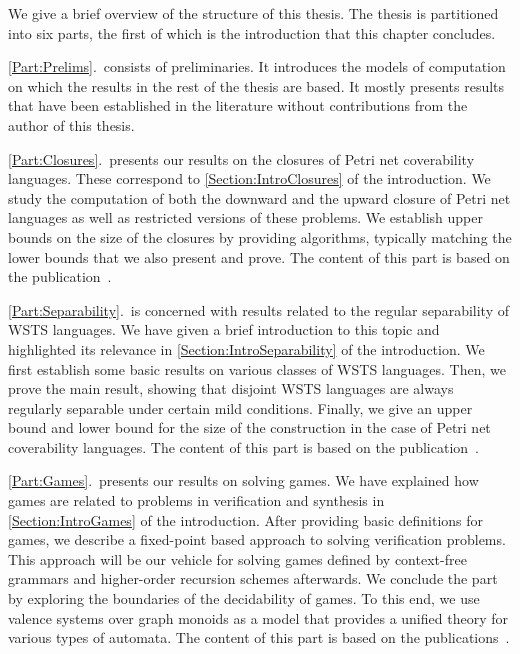 \documentclass[../../diss.tex]{subfiles}
\begin{document}

We give a brief overview of the structure of this thesis.
The thesis is partitioned into six parts, the first of which is the introduction that this chapter concludes.

\cref{Part:Prelims}.~consists of preliminaries.
It introduces the models of computation on which the results in the rest of the thesis are based.
It mostly presents results that have been established in the literature without contributions from the author of this thesis.

\cref{Part:Closures}.~presents our results on the closures of Petri net coverability languages.
These correspond to \cref{Section:IntroClosures} of the introduction.
We study  the computation of both the downward and the upward closure of Petri net languages as well as restricted versions of these problems.
We establish upper bounds on the size of the closures by providing algorithms, typically matching the lower bounds that we also present and prove.
The content of this part is based on the publication~\cite{AtigMMS17}.

\cref{Part:Separability}.~is concerned with results related to the regular separability of WSTS languages.
We have given a brief introduction to this topic and highlighted its relevance in \cref{Section:IntroSeparability} of the introduction.
We first establish some basic results on various classes of WSTS languages.
Then, we prove the main result, showing that disjoint WSTS languages are always regularly separable under certain mild conditions.
Finally, we give an upper bound and lower bound for the size of the construction in the case of Petri net coverability languages.
The content of this part is based on the publication~\cite{CzerwinskiLMMKS18}.

\cref{Part:Games}.~presents our results on solving games.
We have explained how games are related to problems in verification and synthesis in \cref{Section:IntroGames} of the introduction.
After providing basic definitions for games, we describe a fixed-point based approach to solving verification problems.
This approach will be our vehicle for solving games defined by context-free grammars and higher-order recursion schemes afterwards.
We conclude the part by exploring the boundaries of the decidability of games.
To this end, we use valence systems over graph monoids as a model that provides a unified theory for various types of automata.
The content of this part is based on the publications~\cite{HolikMM16,HagueMM17,MeyerMZ18,MeyerMN17a}.
\end{document}

